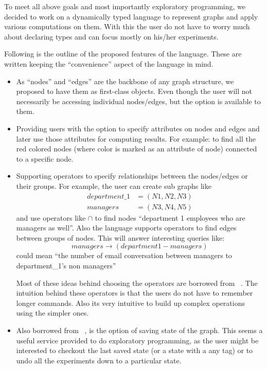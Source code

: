 \documentclass[12,twoside]{article}
\begin{document}
   To meet all above goals and most importantly exploratory programming, we decided 
     to work on a dynamically typed language to represent graphs
     and apply various computations on them.
     With this the user do not have to worry much about declaring types and can
     focus mostly on his/her experiments.

 Following is the outline of the proposed features
 of the language. These are written keeping the
 ``convenience'' aspect of the language in mind.

 \begin{itemize}
   \item As ``nodes'' and ``edges'' are the backbone of any graph structure, we proposed to have them as 
  first-class objects. Even though the user will not necessarily
  be accessing individual nodes/edges, but the option is available to them.
  \item Providing users with the option to specify attributes on nodes and edges and later use
  those attributes for computing results. For example: to find all the red colored nodes (where color is marked as an attribute of
      node) connected to a specific node.
  \item Supporting  operators to specify relationships between the nodes/edges or their groups.
  For example, the user can create sub graphs like
  \begin{align}
          department\_1 &= (N1,N2,N3) \\
          managers &= (N3,N4,N5) 
  \end{align}
  and use operators like $\cap$ to find
  nodes ``department 1 employees who are managers as well''.
  Also the language supports operators to find edges between groups of nodes. 
  This will answer interesting queries like:
  $$managers \rightarrow  (department 1 - managers) $$ could mean
  ``the number of email conversation between managers to department\_1's non managers''

  Most of these ideas
  behind choosing the operators are borrowed from ~\cite{Adar}.  
  The intuition behind these operators is that the users do not have to remember longer 
  commands. Also its very intuitive to build up complex operations using the simpler ones.

   \item Also borrowed from ~\cite{Adar}, is the option of saving state of the graph.
     This seems a useful service provided to do exploratory programming, as the user might be interested to 
     checkout the last saved state  (or a state with a any tag) or to undo all the experiments
     down to a particular state.

  \end{itemize}
     
\end{document}
